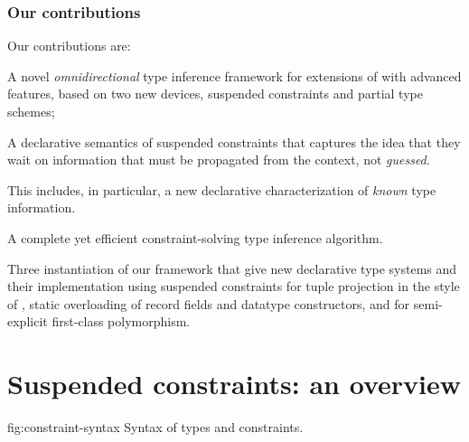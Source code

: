 \documentclass[acmsmall,screen,nonacm,review]{acmart}
\begin{document}
\subsubsection* {Our contributions}

Our contributions are:
\begin{enumerate*}
\item
  A novel \emph{omnidirectional} type inference framework for
  extensions of \ML with advanced features, based on two new devices,
  suspended constraints and partial type schemes;

\item A declarative semantics of suspended constraints that captures the
  idea that they wait on information that must be propagated from the
  context, not \emph{guessed}.

  This includes, in particular, a new declarative characterization of
  \emph{known} type information.

\item
  A complete yet efficient constraint-solving type inference algorithm.

\item
  Three instantiation of our framework that give new declarative type
  systems and their implementation using suspended constraints for tuple
  projection in the style of \SML, static overloading of record fields and
  datatype constructors, and for semi-explicit first-class polymorphism.

\end{enumerate*}

\section{Suspended constraints: an overview}
\label{sec:constraints}

\begin{bnffig}[t]%
  {fig:constraint-syntax}%
  {Syntax of types and constraints.}
\\
\entry[Types]{\t}{
    \tv \and
    \tunit \and
    \ta \to \tb \color{gray} \and
    \Pi\iton \ti \and
    \T \tys \and
    \tpoly \ts
}\\
\\[1ex]
\entry[Constraints]{\c}{
        \ctrue
  \and  \cfalse
  \and  \ca \cand \cb
  \and  \cexists \tv \c
  \and 	\cfor \tv \c
  \and  \cunif \ta \tb
  \nextline
  \and  \clet \x \tv \ca \cb
  \and  \capp \x \t
  \nextline
  \and  \cmatch \t \cbrs
}\\[1ex]
\entry[Branches]{\cbr}{\cbranch \cpat \c} \\
\entry[Patterns]{\cpat}{}{} \\[1ex]
 \\
\entry[Shapes] {\Sh} {} {}
\\
 {} {}
\end{bnffig}
\end{document}
